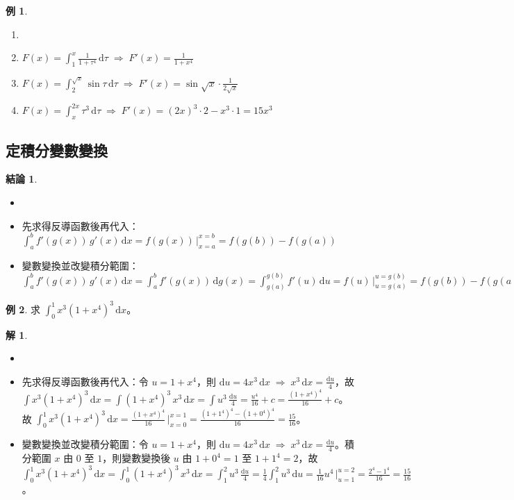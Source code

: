 \documentclass[12pt]{extarticle}
\newcommand{\ds}{\displaystyle}
\newcommand{\ie}{\;\Longrightarrow\;}
\theoremstyle{definition}
\newtheorem*{fact}{結論}
\newtheorem*{ex}{例}
\newtheorem*{sol}{解}
\begin{document}
\begin{ex} 
  \begin{enumerate}\setlength\itemsep{0em}
    \item[]
    \item $\ds F(x) = \int_1^x\frac{1}{1 + \tau^4}\,\mathrm{d}\tau \ie F'(x) = \frac{1}{1 + x^4}$ 
    \item $\ds F(x) = \int_2^{\sqrt{x}}\sin\tau\,\mathrm{d}\tau \ie F'(x) = \sin\sqrt{x}\cdot\frac{1}{2\sqrt{x}}$
    \item $\ds F(x) = \int_{x}^{2x}\tau^3\,\mathrm{d}\tau \ie F'(x) = (2x)^3\cdot 2 - x^3\cdot 1 = 15x^3$
  \end{enumerate}
\end{ex}

\subsection*{定積分變數變換}

\begin{fact} 
  \begin{itemize}\setlength\itemsep{0em}
    \item[]
    \item 先求得反導函數後再代入：$\ds\int_a^b f'(g(x))\,g'(x)\,\text{d}x = f(g(x))\,\Big|_{x = a}^{x = b} = f(g(b)) - f(g(a))$
    \item 變數變換並改變積分範圍：$\ds\int_a^b f'(g(x))\,g'(x)\,\text{d}x = \int_a^b f'(g(x))\,\text{d}g(x) =\int_{g(a)}^{g(b)} f'(u)\,\text{d}u = f(u)\,\Big|_{u = g(a)}^{u = g(b)} = f(g(b)) - f(g(a))$
  \end{itemize}
\end{fact}

\begin{ex}
  求 $\ds\int_0^1 x^3(1 + x^4)^3\,\text{d}x$。
\end{ex}

\begin{sol}
  \begin{itemize}\setlength\itemsep{0em}
    \item[]
    \item 先求得反導函數後再代入：令 $\ds u = 1 + x^4$，則 $\ds\text{d}u = 4 x^3\,\text{d}x\ie x^3\,\text{d}x = \frac{\text{d}u}{4}$，故 $\ds\int x^3(1 + x^4)^3\,\text{d}x = \int (1 + x^4)^3\,x^3\,\text{d}x = \int u^3\,\frac{\text{d}u}{4} = \frac{u^4}{16} + c = \frac{(1 + x^4)^4}{16} + c$。故 $\ds\int_0^1 x^3(1 + x^4)^3\,\text{d}x = \frac{(1 + x^4)^4}{16}\,\Big|_{x = 0}^{x = 1} = \frac{(1 + 1^4)^4 - (1 + 0^4)^4}{16} = \frac{15}{16}$。
    \item 變數變換並改變積分範圍：令 $\ds u = 1 + x^4$，則 $\ds\text{d}u = 4 x^3\,\text{d}x\ie x^3\,\text{d}x = \frac{\text{d}u}{4}$。積分範圍 $x$ 由 $0$ 至 $1$，則變數變換後 $u$ 由 $\ds 1 + 0^4 = 1$ 至 $\ds1 + 1^4 = 2$，故 $\ds\int_0^1 x^3(1 + x^4)^3\,\text{d}x = \int_0^1 (1 + x^4)^3\,x^3\,\text{d}x = \int_1^2 u^3\,\frac{\text{d}u}{4} = \frac{1}{4}\int_1^2 u^3\,\text{d}u = \frac{1}{16} u^4\,\Big|_{u = 1}^{u = 2} = \frac{2^4 - 1^4}{16} = \frac{15}{16}$。
  \end{itemize}
\end{sol}
\end{document}
